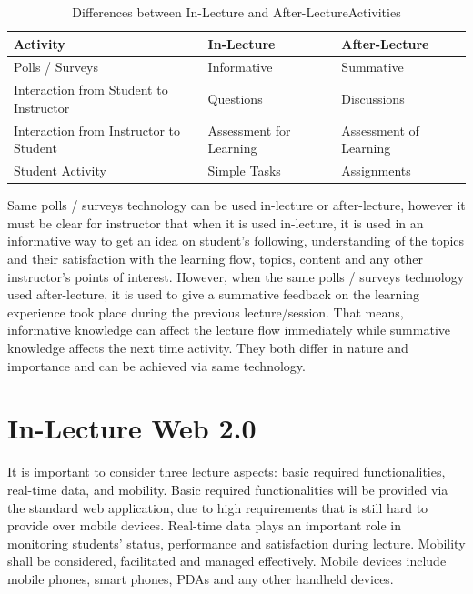 \documentclass[12pt,a4paper,final,twoside,onecolumn,titlepage]{book}
\begin{document}
\begin{table}
\begin{center}
\caption{Differences between In-Lecture and After-LectureActivities}
\begin{tabularx}{\textwidth}{|X|X|X|}
\hline Activity & In-Lecture & After-Lecture \\
\hline Polls / Surveys & Informative	 & Summative \\
\hline Interaction from Student to Instructor	& Questions	& Discussions \\
\hline Interaction from Instructor to Student	& Assessment for Learning	& Assessment of Learning \\
\hline Student Activity	& Simple Tasks	 & Assignments\\
\hline
\end{tabularx}
\end{center}
\label{Web2-T5}
\end{table}
Same polls / surveys technology can be used in-lecture or after-lecture, however it must be clear for instructor that when it is used in-lecture, it is used in an informative way to get an idea on student’s following, understanding of the topics and their satisfaction with the learning flow, topics, content and any other instructor’s points of interest. However, when the same polls / surveys technology used after-lecture, it is used to give a summative feedback on the learning experience took place during the previous lecture/session. That means, informative knowledge can affect the lecture flow immediately while summative knowledge affects the next time activity. They both differ in nature and importance and can be achieved via same technology.

\section{In-Lecture Web 2.0}
It is important to consider three lecture aspects: basic required functionalities, real-time data, and mobility. Basic required functionalities will be provided via the standard web application, due to high requirements that is still hard to provide over mobile devices. Real-time data plays an important role in monitoring students’ status, performance and satisfaction during lecture. Mobility shall be considered, facilitated and managed effectively. Mobile devices include mobile phones, smart phones, PDAs and any other handheld devices.
\end{document}
